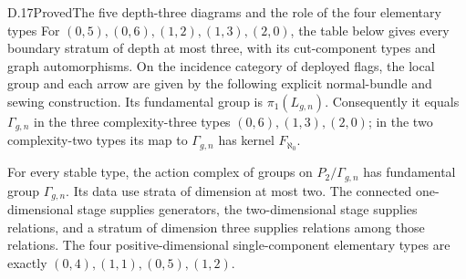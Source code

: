 \begin{result}{D.17}{Proved}{The five depth-three diagrams and the role of the four elementary types}
For $(0,5),(0,6),(1,2),(1,3),(2,0)$, the table below gives every boundary stratum of depth at most three, with its cut-component types and graph automorphisms. On the incidence category of deployed flags, the local group and each arrow are given by the following explicit normal-bundle and sewing construction. Its fundamental group is $\pi_1(L_{g,n})$. Consequently it equals $\Gamma_{g,n}$ in the three complexity-three types $(0,6),(1,3),(2,0)$; in the two complexity-two types its map to $\Gamma_{g,n}$ has kernel $F_{\aleph_0}$.

For every stable type, the action complex of groups on $P_2/\Gamma_{g,n}$ has fundamental group $\Gamma_{g,n}$. Its data use strata of dimension at most two. The connected one-dimensional stage supplies generators, the two-dimensional stage supplies relations, and a stratum of dimension three supplies relations among those relations. The four positive-dimensional single-component elementary types are exactly $(0,4),(1,1),(0,5),(1,2)$.
\end{result}
